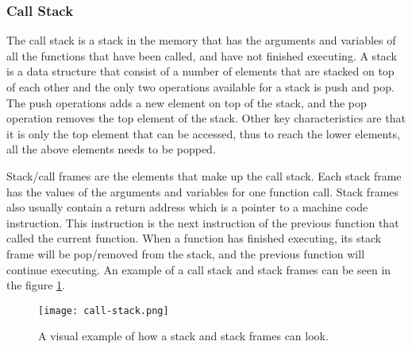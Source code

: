 \subsubsection{Call Stack}
The call stack is a stack in the memory that has the arguments and variables of all the functions that have been called, and have not finished executing.
A stack is a data structure that consist of a number of elements that are stacked on top of each other and the only two operations available for a stack is push and pop.
The push operations adds a new element on top of the stack, and the pop operation removes the top element of the stack.
Other key characteristics are that it is only the top element that can be accessed, thus to reach the lower elements, all the above elements needs to be popped.


Stack/call frames are the elements that make up the call stack.
Each stack frame has the values of the arguments and variables for one function call.
Stack frames also usually contain a return address which is a pointer to a machine code instruction.
This instruction is the next instruction of the previous function that called the current function.
When a function has finished executing, its stack frame will be pop/removed from the stack, and the previous function will continue executing. 
An example of a call stack and stack frames can be seen in the figure \ref{fig:callstack}.


\begin{figure}[h]
	\centering
	\texttt{[image: call-stack.png]}
	\caption{A visual example of how a stack and stack frames can look.}
	\label{fig:callstack}
\end{figure}



